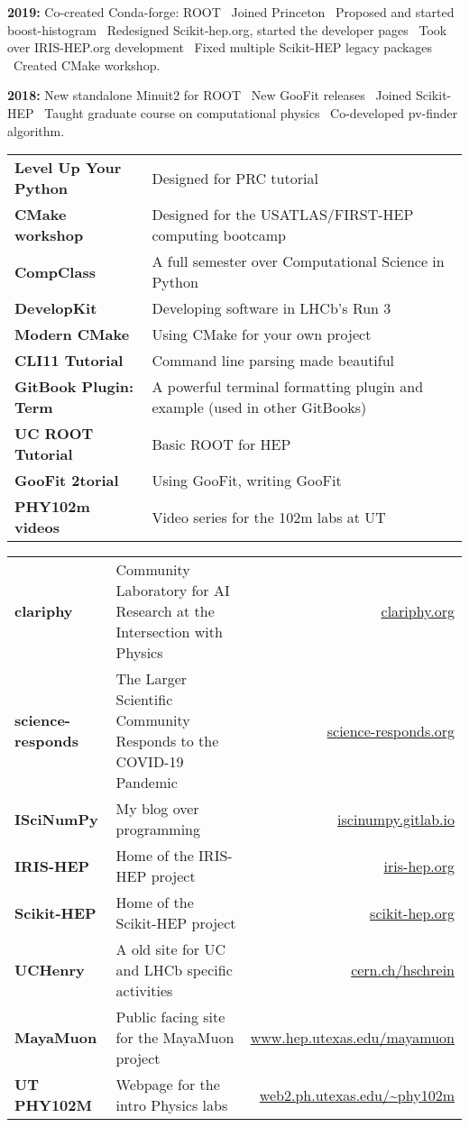 \documentclass[10pt,letterpaper]{moderncv}
\begin{document}
\textbf{2019:}
Co-created Conda-forge: ROOT \textbullet\
Joined Princeton \textbullet\
Proposed and started boost-histogram \textbullet\
Redesigned Scikit-hep.org, started the developer pages \textbullet\
Took over IRIS-HEP.org development \textbullet\
Fixed multiple Scikit-HEP legacy packages \textbullet\ Created CMake workshop.

\textbf{2018:} New standalone Minuit2 for ROOT \textbullet\
New GooFit releases \textbullet\
Joined Scikit-HEP \textbullet\
Taught graduate course on computational physics \textbullet\
Co-developed pv-finder algorithm.

\mysection{Other writings}

\begin{tabularx}{\textwidth}{>{\bfseries}p{1.6in}X}
Level Up Your Python & Designed for PRC tutorial \\
CMake workshop & Designed for the USATLAS/FIRST-HEP computing bootcamp \\
CompClass & A full semester over Computational Science in Python \\
DevelopKit & Developing software in LHCb’s Run 3 \\
Modern CMake & Using CMake for your own project \\
CLI11 Tutorial & Command line parsing made beautiful \\
GitBook Plugin: Term & A powerful terminal formatting plugin and example (used in other GitBooks) \\
UC ROOT Tutorial & Basic ROOT for HEP \\
GooFit 2torial & Using GooFit, writing GooFit \\
PHY102m videos & Video series for the 102m labs at UT \\
\end{tabularx}

\mysection{Selected websites}

\begin{tabularx}{\textwidth}{>{\bfseries}p{1.45in}Xr}
clariphy & Community Laboratory for AI Research at the Intersection with Physics & \url{clariphy.org} \\
science-responds & The Larger Scientific Community Responds to the COVID-19 Pandemic & \url{science-responds.org} \\
ISciNumPy & My blog over programming & \url{iscinumpy.gitlab.io} \\
IRIS-HEP & Home of the IRIS-HEP project & \url{iris-hep.org} \\
Scikit-HEP & Home of the Scikit-HEP project & \url{scikit-hep.org} \\
UCHenry & A old site for UC and LHCb specific activities & \url{cern.ch/hschrein}  \\
MayaMuon & Public facing site for the MayaMuon project & \url{www.hep.utexas.edu/mayamuon} \\
UT PHY102M & Webpage for the intro Physics labs & \url{web2.ph.utexas.edu/~phy102m}  \\
\end{tabularx}
\end{document}

